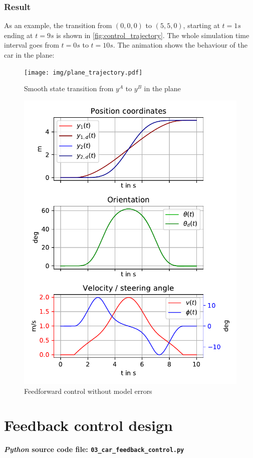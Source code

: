 \documentclass[a4paper,11pt,headings=standardclasses,parskip=half]{scrartcl}
\newcommand{\py}{\emph{Python}\xspace}
\begin{document}
\subsubsection{Result}
\label{subsec:result}
As an example, the transition from $(0, 0, 0)$ to $(5, 5, 0)$, starting at $t=1s$ ending at $t=9s$ is shown in \autoref{fig:control_trajectory}. The whole simulation time interval goes from $t=0s$ to $t=10s$.
The animation shows the behaviour of the car in the plane:
\begin{figure}[ht]
\centering
\texttt{[image: img/plane\_trajectory.pdf]}
\caption{Smooth state transition from $y^A$ to $y^B$ in the plane}
\label{fig:plane_trajectory}
\end{figure}
\begin{figure}[ht]
\centering
\includegraphics[scale=1]{img/control_trajectory.pdf}
\caption{Feedforward control without model errors}
\label{fig:control_trajectory}
\end{figure}
\clearpage
\section{Feedback control design}
\label{sec:fbcontrol}
\textbf{\py source code file: \texttt{03\_car\_feedback\_control.py}}
\end{document}
